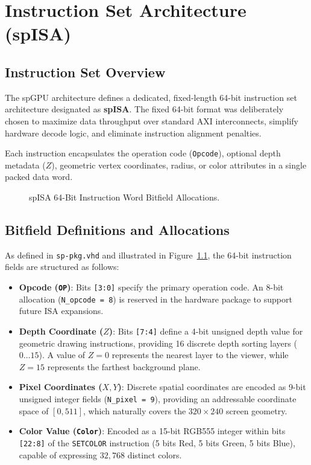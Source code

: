 \chapter{Instruction Set Architecture (spISA)}
\label{chap:isa}

\section{Instruction Set Overview}
The spGPU architecture defines a dedicated, fixed-length 64-bit instruction set architecture designated as \textbf{spISA}. The fixed 64-bit format was deliberately chosen to maximize data throughput over standard AXI interconnects, simplify hardware decode logic, and eliminate instruction alignment penalties.

Each instruction encapsulates the operation code (\texttt{Opcode}), optional depth metadata ($Z$), geometric vertex coordinates, radius, or color attributes in a single packed data word.

\begin{figure}[htbp]
\centering
\resizebox{0.95\textwidth}{!}{
    
}
\caption{spISA 64-Bit Instruction Word Bitfield Allocations.}
\label{fig:spisa_bitfields}
\end{figure}

\section{Bitfield Definitions and Allocations}
As defined in \texttt{sp-pkg.vhd} and illustrated in Figure~\ref{fig:spisa_bitfields}, the 64-bit instruction fields are structured as follows:
\begin{itemize}
    \item \textbf{Opcode (\texttt{OP})}: Bits \texttt{[3:0]} specify the primary operation code. An 8-bit allocation (\texttt{N\_opcode = 8}) is reserved in the hardware package to support future ISA expansions.
    \item \textbf{Depth Coordinate ($Z$)}: Bits \texttt{[7:4]} define a 4-bit unsigned depth value for geometric drawing instructions, providing 16 discrete depth sorting layers ($0 \dots 15$). A value of $Z = 0$ represents the nearest layer to the viewer, while $Z = 15$ represents the farthest background plane.
    \item \textbf{Pixel Coordinates ($X, Y$)}: Discrete spatial coordinates are encoded as 9-bit unsigned integer fields (\texttt{N\_pixel = 9}), providing an addressable coordinate space of $[0, 511]$, which naturally covers the $320 \times 240$ screen geometry.
    \item \textbf{Color Value (\texttt{Color})}: Encoded as a 15-bit RGB555 integer within bits \texttt{[22:8]} of the \texttt{SETCOLOR} instruction (5 bits Red, 5 bits Green, 5 bits Blue), capable of expressing $32{,}768$ distinct colors.
\end{itemize}

